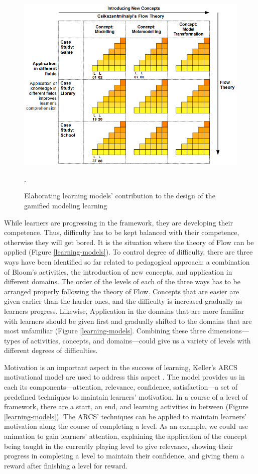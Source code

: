 \documentclass[12pt, a4paper]{report} \usepackage[titletoc]{appendix}
\begin{document}
\begin{appendices}
\begin{figure}[ht]
\centering
\includegraphics[width=\textwidth]{learning-models2}
\caption{Elaborating learning models' contribution to the design of the gamified modeling learning}.
\label{learning-models2}
\end{figure}

While learners are progressing in the framework, they are developing their competence. Thus, difficulty has to be kept balanced with their competence, otherwise they will get bored. It is the situation where the theory of Flow can be applied (Figure \ref{learning-models}). To control degree of difficulty, there are three ways have been identified so far related to pedagogical approach: a combination of Bloom's activities, the introduction of new concepts, and application in different domains. The order of the levels of each of the three ways has to be arranged properly following the theory of Flow. Concepts that are easier are given earlier than the harder ones, and the difficulty is increased gradually as learners progress. Likewise, Application in the domains that are more familiar with learners should be given first and gradually shifted to the domains that are most unfamiliar (Figure \ref{learning-models}. Combining these three dimensions---types of activities, concepts, and domains---could give us a variety of levels with different degrees of difficulties.

Motivation is an important aspect in the success of learning, Keller's ARCS motivational model are used to address this aspect \cite{keller2010motivational}. The model provides us in each its components---attention, relevance, confidence, satisfaction---a set of predefined techniques to maintain learners' motivation. In a course of a level of framework, there are a start, an end, and learning activities in between (Figure \ref{learning-models}). The ARCS' techniques can be applied to maintain learners' motivation along the course of completing a level. As an example, we could use animation to gain learners' attention, explaining the application of the concept being taught in the currently playing level to give relevance, showing their progress in completing a level to maintain their confidence, and giving them a reward after finishing a level for reward.
 

\end{appendices}
\end{document}
